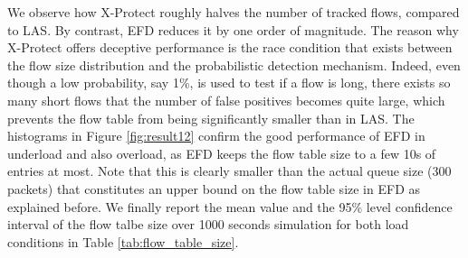 \documentclass[preprint,12pt]{elsarticle}
\begin{document}
We observe how X-Protect roughly halves the number of tracked flows, compared to LAS. By contrast, EFD reduces it by one order of magnitude. The reason why X-Protect offers deceptive performance is the race condition that exists between the flow size distribution and the probabilistic detection mechanism. Indeed, even though a low probability, say 1\%, is used to test if a flow is long, there exists so many short flows that the number of false positives becomes quite large, which prevents the flow table from being significantly smaller than in LAS. The histograms in Figure \ref{fig:result12} confirm the good performance of EFD in underload and also overload, as EFD keeps the flow table size to a few 10s of entries at most. Note that this is clearly smaller than the actual queue size (300 packets) that constitutes an upper bound on the flow table size in EFD as explained before. We finally report the mean value and the 95\% level confidence interval of the flow talbe size over 1000 seconds simulation for both load conditions in Table \ref{tab:flow_table_size}. 


\end{document}
